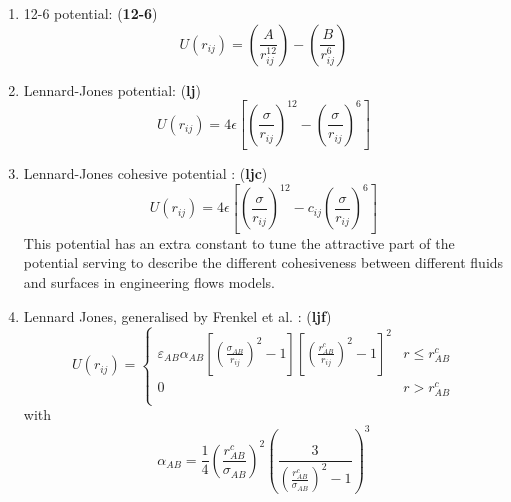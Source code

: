 \begin{enumerate}
\item 12-6 potential:  ({\bf 12-6})
\begin{equation}
U(r_{ij}) =
\left(\frac{A}{r_{ij}^{12}}\right)-\left(\frac{B}{r_{ij}^{6}}\right)
\end{equation}
\item Lennard-Jones potential:  ({\bf lj})
\begin{equation}
U(r_{ij}) = 4\epsilon\left[\left
(\frac{\sigma}{r_{ij}}\right)^{12}-\left(\frac{\sigma}{r_{ij}}\right)^{6}\right]
\end{equation}
\item Lennard-Jones cohesive potential \cite{barrat-99a}:  ({\bf ljc})
\begin{equation}
U(r_{ij}) = 4\epsilon\left[\left
(\frac{\sigma}{r_{ij}}\right)^{12}-c_{ij}\left(\frac{\sigma}{r_{ij}}\right)^{6}\right]
\end{equation}
This potential has an extra constant to tune the attractive part of the
potential serving to describe the different cohesiveness between different
fluids and surfaces in engineering flows models.
\item Lennard Jones, generalised by Frenkel et al. \cite{wang2019}: ({\bf ljf})
  \begin{equation}
     U(r_{ij}) = \left\{
\begin{array}{lr}
\varepsilon_{AB}\alpha_{AB}\left[ \left(\frac{\sigma_{AB}}{r_{ij}}\right)^2 -1\right]\left[ \left(\frac{r_{AB}^c}{r_{ij}}\right)^2 -1\right]^2 & r \leq r_{AB}^c \\
0 & r >  r_{AB}^c \\
\end{array}
\right.
  \label{eq:ljf}
  \end{equation}
    with
\begin{equation}
    \alpha_{AB} = \frac{1}{4}\left(\frac{r_{AB}^c}{\sigma_{AB}}\right)^2\left( \frac{3}{\left(\frac{r_{AB}^c}{\sigma_{AB}}\right)^2-1}\right)^3
\end{equation}


\end{enumerate}
